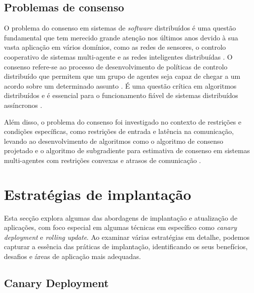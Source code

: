 \subsection{Problemas de consenso}

O problema do consenso em sistemas de \textit{software} distribuídos é uma questão fundamental que 
tem merecido grande atenção nos últimos anos devido à sua vasta aplicação em vários domínios, como
as redes de sensores, o controlo cooperativo de sistemas multi-agente e as redes inteligentes 
distribuídas \cite{consensus2020}. O consenso refere-se ao processo de desenvolvimento de políticas 
de controlo distribuído que permitem que um grupo de agentes seja capaz de chegar a um acordo sobre 
um determinado assunto \cite{consensus2013}. É uma questão crítica em algoritmos distribuídos e é
essencial para o funcionamento fiável de sistemas distribuídos assíncronos \cite{consesus2016} 
\cite{consensus2011}.

Além disso, o problema do consenso foi investigado no contexto de restrições e condições
específicas, como restrições de entrada e latência na comunicação, levando ao desenvolvimento de
algoritmos como o algoritmo de consenso projetado e o algoritmo de subgradiente para estimativa 
de consenso em sistemas multi-agentes com restrições convexas e atrasos de comunicação 
\cite{consensus2018}.

\section{Estratégias de implantação}

Esta secção explora algumas das abordagens de implantação e atualização de aplicações, com foco 
especial em algumas técnicas em específico como \textit{canary deployment} e \textit{rolling update}.
Ao examinar várias estratégias em detalhe, podemos capturar a essência das práticas de implantação, 
identificando os seus benefícios, desafios e áreas de aplicação mais adequadas. 

\subsection{Canary Deployment}


